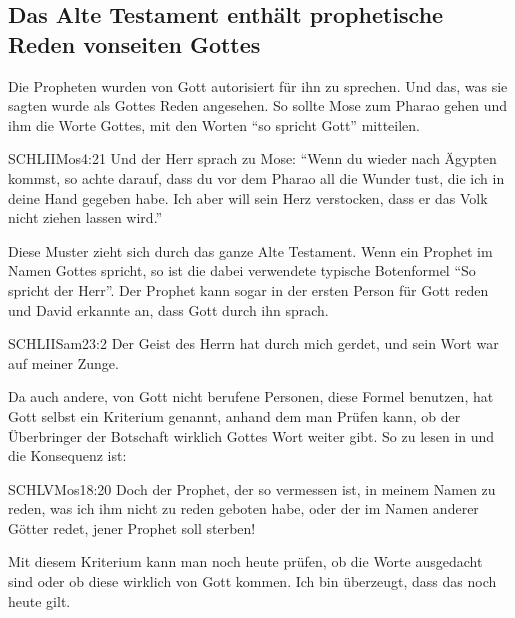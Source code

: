 \subsection{Das Alte Testament enthält prophetische Reden vonseiten Gottes}
Die Propheten wurden von Gott autorisiert für ihn zu sprechen. Und das, was sie sagten wurde als Gottes Reden angesehen. So sollte Mose zum Pharao gehen und ihm die Worte Gottes, mit den Worten \enquote{so spricht Gott} mitteilen.
\begin{bibelquote}{SCHL}{IIMos}{4:21}
  Und der Herr sprach zu Mose: \enquote{Wenn du wieder nach Ägypten kommst, so achte darauf, dass du vor dem Pharao all die Wunder tust, die ich in deine Hand gegeben habe. Ich aber will sein Herz verstocken, dass er das Volk nicht ziehen lassen wird.}
\end{bibelquote}
Diese Muster zieht sich durch das ganze Alte Testament. Wenn ein Prophet im Namen Gottes spricht, so ist die dabei verwendete typische Botenformel \enquote{So spricht der Herr}. Der Prophet kann sogar in der ersten Person für Gott reden und David erkannte an, dass Gott durch ihn sprach.
\begin{bibelquote}{SCHL}{IISam}{23:2}
  Der Geist des Herrn hat durch mich gerdet, und sein Wort war auf meiner Zunge.
\end{bibelquote}
Da auch andere, von Gott nicht berufene Personen, diese Formel benutzen, hat Gott selbst ein Kriterium genannt, anhand dem man Prüfen kann, ob der Überbringer der Botschaft wirklich Gottes Wort weiter gibt. So zu lesen in  und die Konsequenz ist:
\begin{bibelquote}{SCHL}{VMos}{18:20}
  Doch der Prophet, der so vermessen ist, in meinem Namen zu reden, was ich ihm nicht zu reden geboten habe, oder der im Namen anderer Götter redet, jener Prophet soll sterben!
\end{bibelquote}
Mit diesem Kriterium kann man noch heute prüfen, ob die Worte ausgedacht sind oder ob diese wirklich von Gott kommen. Ich bin überzeugt, dass das noch heute gilt.
